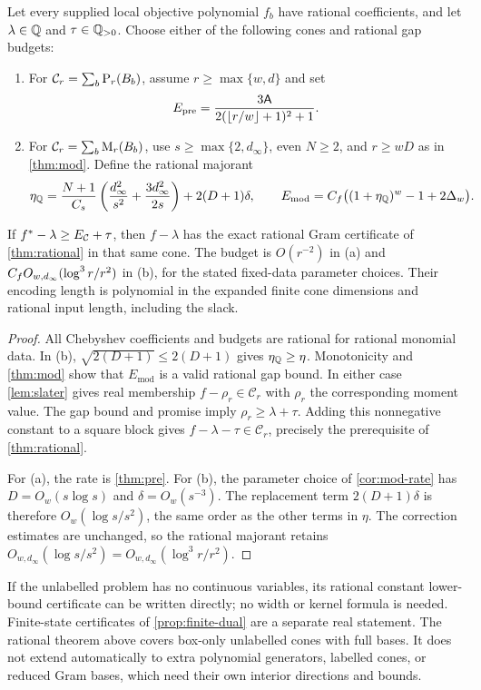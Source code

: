 \begin{corollary}
\label{cor:rational-mod}
Let every supplied local objective polynomial $f_b$ have rational
coefficients, and let $\lambda\in\mathbb{Q}$ and $\tau\in\mathbb{Q}_{>0}$.
Choose either of the following cones and rational gap
budgets:
\begin{enumerate}[label=(\alph*)]
\item For $\mathcal C_r=\sum_b\mathrm{P}_r(B_b)$, assume
$r\ge\max\{w,d\}$ and set
\[
 E_{\mathrm{pre}}=\frac{3\mathsf{A}}{2(\lfloor r/w\rfloor+1)^2+1}.
\]
\item For $\mathcal C_r=\sum_b\mathrm{M}_r(B_b)$, use
$s\ge\max\{2,d_\infty\}$, even $N\ge2$, and $r\ge wD$ as in
\cref{thm:mod}. Define the rational majorant
\[
 \eta_{\mathbb{Q}}=\frac{N+1}{C_s}
 \left(\frac{d_\infty^2}{s^2}+\frac{3d_\infty^2}{2s}\right)
       +2(D+1)\delta,
 \qquad E_{\mathrm{mod}}=C_f\bigl((1+\eta_{\mathbb{Q}})^w-1+2\Delta_w\bigr).
\]
\end{enumerate}
If $f^{*}-\lambda\ge E_{\mathcal C}+\tau$, then $f-\lambda$ has the
exact rational Gram certificate of \cref{thm:rational} in that same cone.
The budget is $O(r^{-2})$ in (a) and
$C_f O_{w,d_\infty}(\log^3r/r^2)$ in (b), for the stated fixed-data
parameter choices. Their encoding length is polynomial in the expanded
finite cone dimensions and rational input length, including the slack.
\end{corollary}
\begin{proof}
All Chebyshev coefficients and budgets are rational for rational monomial
data. In (b), $\sqrt{2(D+1)}\le2(D+1)$ gives $\eta_{\mathbb{Q}}\ge\eta$.
Monotonicity and \cref{thm:mod} show that $E_{\mathrm{mod}}$ is a valid
rational gap bound. In either case \cref{lem:slater} gives real membership
$f-\rho_r\in\mathcal C_r$ with $\rho_r$ the corresponding moment value.
The gap bound and promise imply $\rho_r\ge\lambda+\tau$. Adding this
nonnegative constant to a square block gives
$f-\lambda-\tau\in\mathcal C_r$, precisely the prerequisite of
\cref{thm:rational}.

For (a), the rate is \cref{thm:pre}. For (b), the parameter choice of
\cref{cor:mod-rate} has $D=O_w(s\log s)$ and
$\delta=O_w(s^{-3})$. The replacement term $2(D+1)\delta$ is therefore
$O_w(\log s/s^2)$, the same order as the other terms in $\eta$.
The correction estimates are unchanged, so the rational majorant retains
$O_{w,d_\infty}(\log s/s^2)=O_{w,d_\infty}(\log^3r/r^2)$.
\end{proof}

If the unlabelled problem has no continuous variables, its rational
constant lower-bound certificate can be written directly; no width or
kernel formula is needed. Finite-state certificates of
\cref{prop:finite-dual} are a separate real statement. The rational theorem
above covers box-only unlabelled cones with full bases. It does not extend
automatically to extra polynomial generators, labelled cones, or reduced
Gram bases, which need their own interior directions and bounds.

